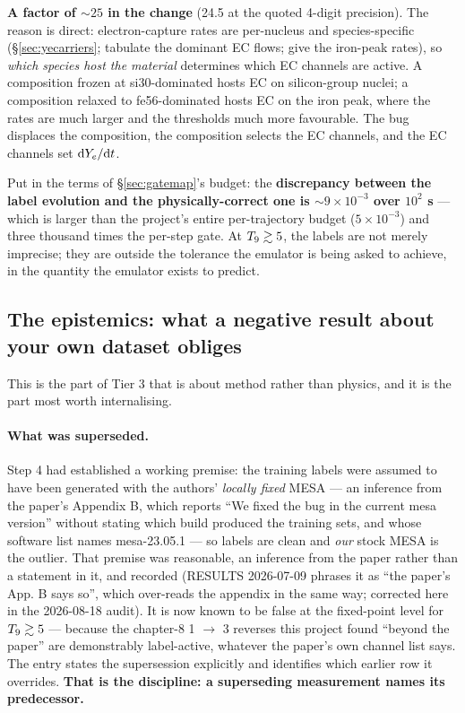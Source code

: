 \textbf{A factor of ${\sim}25$ in the \Ye{} change} (24.5 at the quoted
4-digit precision). The reason is direct: electron-capture rates are
per-nucleus and species-specific (\S\ref{sec:yecarriers}; \citealt{heger2001}
tabulate the dominant EC flows; \citealt{langanke2000} give the iron-peak
rates), so \emph{which species host the material} determines which EC channels
are active. A composition frozen at si30-dominated hosts EC on silicon-group
nuclei; a composition relaxed to fe56-dominated hosts EC on the iron peak,
where the rates are much larger and the thresholds much more favourable. The
bug displaces the composition, the composition selects the EC channels, and the
EC channels set $\mathrm{d}Y_{e}/\mathrm{d} t$.

Put in the terms of \S\ref{sec:gatemap}'s budget: the \textbf{discrepancy
between the label \Ye{} evolution and the physically-correct one is
${\sim}9 \times 10^{-3}$ over $10^{2}$ s} --- which is larger than the
project's entire per-trajectory \Ye{} budget ($5 \times 10^{-3}$) and three
thousand times the per-step gate. At $T_{9} \gtrsim 5$, the labels are not merely
imprecise; they are outside the tolerance the emulator is being asked to
achieve, in the quantity the emulator exists to predict.

\subsection{The epistemics: what a negative result about your own dataset obliges}
\label{sec:epistemics}

This is the part of Tier 3 that is about method rather than physics, and it is
the part most worth internalising.

\paragraph{What was superseded.} Step 4 had established a working premise: the
training labels were assumed to have been generated with the authors'
\emph{locally fixed} MESA --- an inference from the paper's Appendix B, which
reports ``We fixed the bug in the current mesa version'' without stating which
build produced the training sets, and whose software list names mesa-23.05.1
--- so labels are clean and \emph{our} stock MESA is the outlier. That premise
was reasonable, an inference from the paper rather than a statement in it, and
recorded (RESULTS 2026-07-09 phrases it as ``the paper's App. B says so'',
which over-reads the appendix in the same way; corrected here in the 2026-08-18
audit). It is now known to be false at the fixed-point level for
$T_{9} \gtrsim 5$ --- because the chapter-8 1 $\to$ 3 reverses this project found
``beyond the paper'' are demonstrably label-active, whatever the paper's own
channel list says. The  entry states the supersession
explicitly and identifies which earlier row it overrides. \textbf{That is the
discipline: a superseding measurement names its predecessor.}

